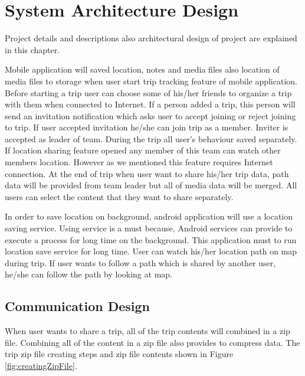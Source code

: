 \chapter{System Architecture Design}

Project details and descriptions also architectural design of project are explained in this chapter.

Mobile application will saved location, notes and media files also location of media files to storage when user start trip tracking feature of mobile application. Before starting a trip user can choose some of his/her friends to organize a trip with them when connected to Internet. If a person added a trip, this person will send an invitation notification which asks user to accept joining or reject joining to trip. If user accepted invitation he/she can join trip as a member. Inviter is accepted as leader of team. During the trip all user's behaviour saved separately. If location sharing feature opened any member of this team can watch other members location. However as we mentioned this feature requires Internet connection. At the end of trip when user want to share his/her trip data, path data will be provided from team leader but all of media data will be merged. All users can select the content that they want to share separately.

In order to save location on background, android application will use a location saving service. Using service is a must because, Android services can provide to execute a process for long time on the background. This application must to run location save service for long time. User can watch his/her location path on map during trip. If user wants to follow a path which is shared by another user, he/she can follow the path by looking at map.

\newpage

\section{Communication Design}

When user wants to share a trip, all of the trip contents will combined in a zip file. Combining all of the content in a zip file also provides to compress data. The trip zip file creating steps and zip file contents shown in Figure \ref{fig:creatingZipFile}.

